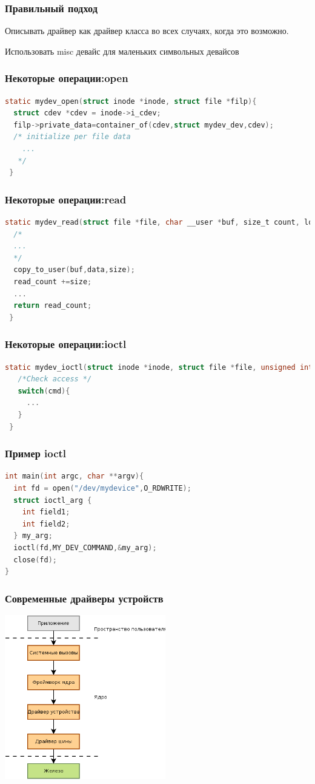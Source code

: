 \begin{frame}
  \frametitle{Правильный подход}
  \begin{center}
    Описывать драйвер как драйвер класса во всех случаях, когда это возможно.

    Использовать misc девайс для маленьких символьных девайсов
  \end{center}
\end{frame}

\begin{frame}[fragile]
  \frametitle{Некоторые операции:open}
\begin{lstlisting}[language=C]
static mydev_open(struct inode *inode, struct file *filp){
  struct cdev *cdev = inode->i_cdev;
  filp->private_data=container_of(cdev,struct mydev_dev,cdev);
  /* initialize per file data
    ...
   */
 }
\end{lstlisting}
\end{frame}

\begin{frame}[fragile]
  \frametitle{Некоторые операции:read}
\begin{lstlisting}[language=C]
static mydev_read(struct file *file, char __user *buf, size_t count, loff_t *ppos){
  /*
  ...
  */
  copy_to_user(buf,data,size);
  read_count +=size;
  ...
  return read_count;
 }
\end{lstlisting}
\end{frame}
\begin{frame}[fragile]
  \frametitle{Некоторые операции:ioctl}
\begin{lstlisting}[language=C]
 static mydev_ioctl(struct inode *inode, struct file *file, unsigned int cmd, unsigned long arg){
   /*Check access */
   switch(cmd){
     ...
   }
 }
\end{lstlisting}
\end{frame}
\begin{frame}[fragile]
  \frametitle{Пример ioctl}
\begin{lstlisting}[language=C]
int main(int argc, char **argv){
  int fd = open("/dev/mydevice",O_RDWRITE);
  struct ioctl_arg {
    int field1;
    int field2;
  } my_arg;
  ioctl(fd,MY_DEV_COMMAND,&my_arg);
  close(fd);
}
\end{lstlisting}
\end{frame}

\begin{frame}[fragile]
  \frametitle{Современные драйверы устройств}
  \includegraphics[width=7cm]{driver-architecture2.png}
\end{frame}  


